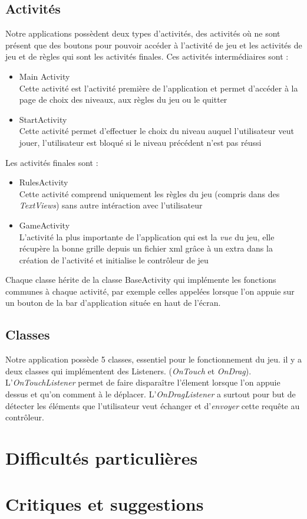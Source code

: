 \subsection{Activités}
Notre applications possèdent deux types d'activités, des activités où ne sont présent que des boutons pour pouvoir accéder à l'activité de jeu et les activités de jeu et de règles qui sont les activités finales. Ces activités intermédiaires sont :
\begin{itemize}
\item Main Activity \\
Cette activité est l'activité première de l'application et permet d'accéder à la page de choix des niveaux,  aux règles du jeu ou  le quitter
\item StartActivity \\
Cette activité permet d'effectuer le choix du niveau auquel l'utilisateur veut jouer, l'utilisateur est bloqué si le niveau précédent n'est pas réussi
\end{itemize}
Les activités finales sont : \\
\begin{itemize}
\item RulesActivity \\
Cette activité comprend uniquement les règles du jeu (compris dans des \textit{TextViews}) sans autre intéraction avec l'utilisateur
\item GameActivity \\
L'activité la plus importante de l'application qui est la \textit{vue} du jeu, elle récupère la bonne  grille depuis un fichier xml grâce à un extra dans la création de l'activité et initialise le contrôleur de jeu
\end{itemize}
Chaque classe hérite de la classe BaseActivity qui implémente les fonctions communes à chaque activité, par exemple celles appelées lorsque l'on appuie sur un bouton de la bar d'application située en haut de l'écran.


\subsection{Classes}
Notre application possède 5 classes, essentiel pour le fonctionnement du jeu. il y a deux classes qui implémentent des Listeners. (\textit{OnTouch} et \textit{OnDrag}). L'\textit{OnTouchListener} permet de faire disparaître l'élement lorsque l'on appuie dessus et qu'on comment à le déplacer.   L'\textit{OnDragListener} a surtout pour but de détecter les éléments que l'utilisateur veut échanger et d'\textit{envoyer} cette requête au contrôleur.
 

\section{Difficultés particulières}

\section{Critiques et suggestions}

